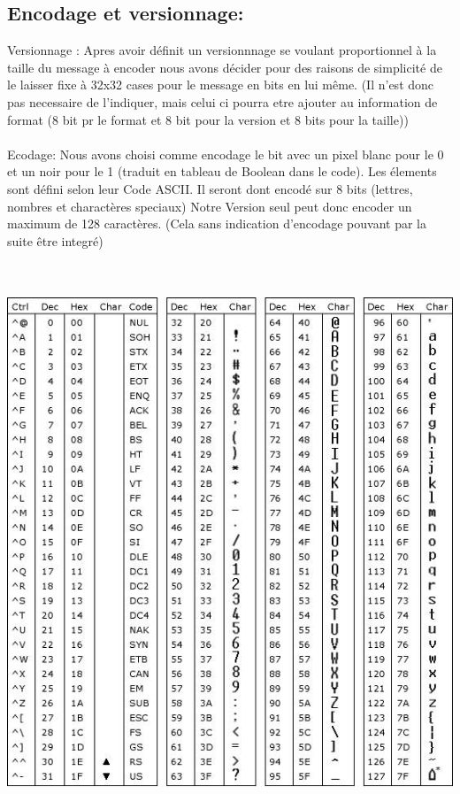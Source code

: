 \documentclass{article}
\begin{document}
\subsection{Encodage et versionnage:}
Versionnage :
Apres avoir définit un versionnnage se voulant proportionnel à la taille du message à encoder nous avons décider pour des raisons de simplicité de le laisser fixe à 32x32 cases pour le message en bits en lui même. (Il n'est donc pas necessaire de l'indiquer, mais celui ci pourra etre ajouter au information de format (8 bit pr le format et 8 bit pour la version et 8 bits pour la taille)) \\
\\
Ecodage:
Nous avons choisi comme encodage le bit avec un pixel blanc pour le 0 et un noir pour le 1 (traduit en tableau de Boolean dans le code). Les élements sont défini selon leur Code ASCII. Il seront dont encodé sur 8 bits (lettres, nombres et charactères speciaux)
Notre Version seul peut donc encoder un maximum de 128 caractères. (Cela sans indication d'encodage pouvant par la suite être integré) 
\\\\\\
\begin{center}
\includegraphics[scale=0.5]{code_ascii_1.jpg} 
\end{center}
\end{document}
